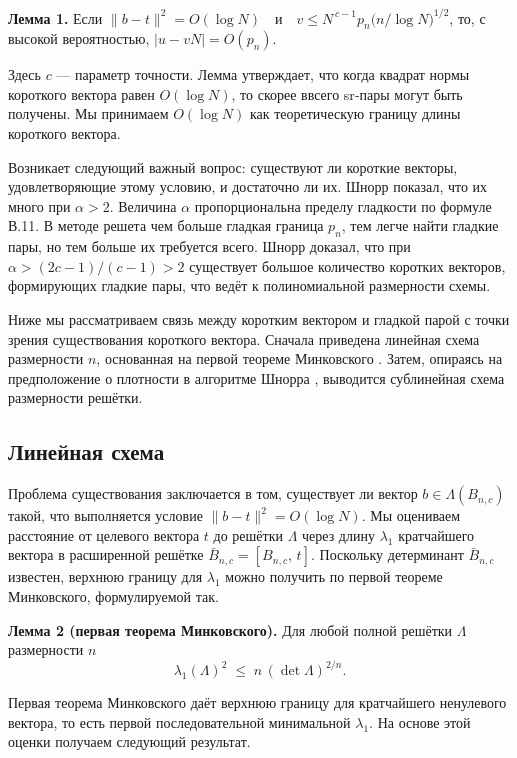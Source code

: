 \textbf{Лемма 1.} Если $\lVert b - t\rVert^{2} = O(\log N) \quad\text{и}\quad
v \le N^{\,c-1}p_{n}\bigl(n/\log N\bigr)^{1/2}$,
то, с высокой вероятностью, $|u-vN| = O(p_{n})$.

Здесь $c$ — параметр точности. Лемма утверждает, что когда квадрат нормы
короткого вектора равен $O(\log N)$, то скорее ввсего sr‑пары могут быть
получены. Мы принимаем $O(\log N)$ как теоретическую границу длины короткого
вектора.

Возникает следующий важный вопрос: существуют ли короткие векторы,
удовлетворяющие этому условию, и достаточно ли их. Шнорр показал, что их много
при $\alpha>2$. Величина $\alpha$ пропорциональна пределу гладкости по формуле
В.11. В методе решета чем больше гладкая граница $p_{n}$, тем легче найти
гладкие пары, но тем больше их требуется всего. Шнорр доказал, что при
$\alpha>(2c-1)/(c-1)>2$ существует большое количество коротких векторов,
формирующих гладкие пары, что ведёт к полиномиальной размерности схемы.

Ниже мы рассматриваем связь между коротким вектором и гладкой парой с точки
зрения существования короткого вектора. Сначала приведена линейная схема
размерности $n$, основанная на первой теореме Минковского \cite{cite_42}.
Затем, опираясь на предположение о плотности в алгоритме Шнорра \cite{cite_30},
выводится сублинейная схема размерности решётки.

\subsection*{Линейная схема}

Проблема существования заключается в том, существует ли вектор
$b\in\Lambda(B_{n,c})$ такой, что выполняется условие $\lVert
b-t\rVert^{2}=O(\log N)$. Мы оцениваем расстояние от целевого вектора $t$ до
решётки $\Lambda$ через длину $\lambda_{1}$ кратчайшего вектора в расширенной
решётке $\bar B_{n,c}=[B_{n,c},\,t]$. Поскольку детерминант $\bar B_{n,c}$
известен, верхнюю границу для $\lambda_{1}$ можно получить по первой теореме
Минковского, формулируемой так.

\textbf{Лемма 2 (первая теорема Минковского).} Для любой полной решётки
$\Lambda$ размерности $n$
\begin{equation}
\lambda_{1}(\Lambda)^{2} \;\le\; n\,(\det\Lambda)^{2/n}.
\end{equation}

Первая теорема Минковского даёт верхнюю границу для кратчайшего ненулевого
вектора, то есть первой последовательной минимальной $\lambda_{1}$. На основе
этой оценки получаем следующий результат.

